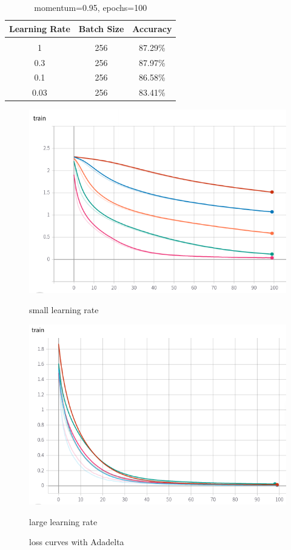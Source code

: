 \documentclass{article} %
\begin{document}
\begin{itemize}
\begin{table}[h]
\caption{momentum=0.95, epochs=100}
\begin{center}
\begin{tabular}{c|c|c}
\multicolumn{1}{c}{\bf Learning Rate} & \multicolumn{1}{c}{\bf Batch Size} &\multicolumn{1}{c}{\bf Accuracy}
\\ \hline \\
1 & 256 & 87.29\% \\      
0.3 & 256 & 87.97\% \\
0.1 & 256 & 86.58\% \\
0.03 & 256 & 83.41\% \\
\end{tabular}
\end{center}
\end{table}

\begin{figure}[htbp]
\centering
{
\begin{minipage}[t]{0.45\textwidth}
\centering
\includegraphics[scale=0.4]{1.png}
\caption{small learning rate}
\end{minipage}
}
{
\begin{minipage}[t]{0.45\linewidth}
\centering
\includegraphics[scale=0.4]{6.png}
\caption{large learning rate}
\end{minipage}
}
\centering
\caption{loss curves with Adadelta}
\end{figure}


\end{itemize}
\end{document}
